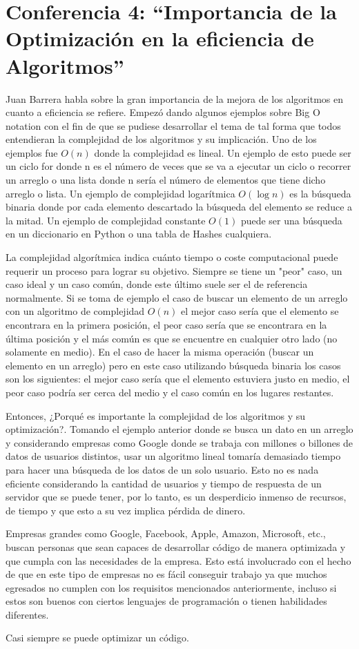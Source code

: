 \documentclass{article}
\begin{document}
\section{Conferencia 4: ``Importancia de la Optimización en la eficiencia de Algoritmos''}
Juan Barrera habla sobre la gran importancia de la mejora de los algoritmos en cuanto a eficiencia se refiere.
Empezó dando algunos ejemplos sobre Big O notation con el fin de que se pudiese desarrollar el tema de tal forma que todos entendieran la complejidad de los algoritmos y su implicación.
Uno de los ejemplos fue $O(n)$ donde la complejidad es lineal. Un ejemplo de esto puede ser un ciclo for donde n es el número de veces que se va a ejecutar un ciclo o recorrer un arreglo o una lista donde n sería el número de elementos que tiene dicho arreglo o lista.
Un ejemplo de complejidad logarítmica $O(\log n)$ es la búsqueda binaria donde por cada elemento descartado la búsqueda del elemento se reduce a la mitad.
Un ejemplo de complejidad constante $O(1)$ puede ser una búsqueda en un diccionario en Python o una tabla de Hashes cualquiera.

La complejidad algorítmica indica cuánto tiempo o coste computacional puede requerir un proceso para lograr su objetivo.
Siempre se tiene un "peor" caso, un caso ideal y un caso común, donde este último suele ser el de referencia normalmente.
Si se toma de ejemplo el caso de buscar un elemento de un arreglo con un algoritmo de complejidad $O(n)$ el mejor caso sería que el elemento se encontrara en la primera posición, el peor caso sería que se encontrara en la última posición y el más común es que se encuentre en cualquier otro lado (no solamente en medio).
En el caso de hacer la misma operación (buscar un elemento en un arreglo) pero en este caso utilizando búsqueda binaria los casos son los siguientes: el mejor caso sería que el elemento estuviera justo en medio, el peor caso podría ser cerca del medio y el caso común en los lugares restantes.

Entonces, ¿Porqué es importante la complejidad de los algoritmos y su optimización?. Tomando el ejemplo anterior donde se busca un dato en un arreglo y considerando empresas como Google donde se trabaja con millones o billones de datos de usuarios distintos, usar un algoritmo lineal tomaría demasiado tiempo para hacer una búsqueda de los datos de un solo usuario. Esto no es nada eficiente considerando la cantidad de usuarios y tiempo de respuesta de un servidor que se puede tener, por lo tanto, es un desperdicio inmenso de recursos, de tiempo y que esto a su vez implica pérdida de dinero.

Empresas grandes como Google, Facebook, Apple, Amazon, Microsoft, etc., buscan personas que sean capaces de desarrollar código de manera optimizada y que cumpla con las necesidades de la empresa. Esto está involucrado con el hecho de que en este tipo de empresas no es fácil conseguir trabajo ya que muchos egresados no cumplen con los requisitos mencionados anteriormente, incluso si estos son buenos con ciertos lenguajes de programación o tienen habilidades diferentes.

Casi siempre se puede optimizar un código.
\end{document}
